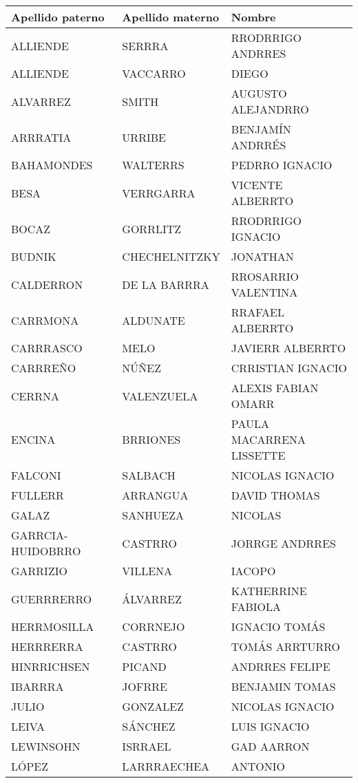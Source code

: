 \begin{table}[h]
\begin{tabular}{|l|l|l|}
\hline
Apellido paterno & Apellido materno & Nombre\\ \hline
ALLIENDE & SERRRA & RRODRRIGO ANDRRES \\ \hline
ALLIENDE & VACCARRO & DIEGO \\ \hline
ALVARREZ & SMITH & AUGUSTO ALEJANDRRO \\ \hline
ARRRATIA & URRIBE & BENJAMÍN ANDRRÉS \\ \hline
BAHAMONDES & WALTERRS & PEDRRO IGNACIO \\ \hline
BESA & VERRGARRA & VICENTE ALBERRTO \\ \hline
BOCAZ & GORRLITZ & RRODRRIGO IGNACIO \\ \hline
BUDNIK & CHECHELNITZKY & JONATHAN \\ \hline
CALDERRON & DE LA BARRRA & RROSARRIO VALENTINA \\ \hline
CARRMONA & ALDUNATE & RRAFAEL ALBERRTO \\ \hline
CARRRASCO & MELO & JAVIERR ALBERRTO \\ \hline
CARRREÑO & NÚÑEZ & CRRISTIAN IGNACIO \\ \hline
CERRNA & VALENZUELA & ALEXIS FABIAN OMARR \\ \hline
ENCINA & BRRIONES & PAULA MACARRENA LISSETTE \\ \hline
FALCONI & SALBACH & NICOLAS IGNACIO  \\ \hline
FULLERR & ARRANGUA & DAVID THOMAS \\ \hline
GALAZ & SANHUEZA & NICOLAS \\ \hline
GARRCIA-HUIDOBRRO & CASTRRO & JORRGE ANDRRES \\ \hline
GARRIZIO & VILLENA & IACOPO \\ \hline
GUERRRERRO & ÁLVARREZ & KATHERRINE FABIOLA \\ \hline
HERRMOSILLA & CORRNEJO & IGNACIO TOMÁS \\ \hline
HERRRERRA & CASTRRO & TOMÁS ARRTURRO \\ \hline
HINRRICHSEN & PICAND & ANDRRES FELIPE \\ \hline
IBARRRA & JOFRRE & BENJAMIN TOMAS \\ \hline
JULIO & GONZALEZ & NICOLAS IGNACIO \\ \hline
LEIVA & SÁNCHEZ & LUIS IGNACIO \\ \hline
LEWINSOHN & ISRRAEL & GAD AARRON \\ \hline
LÓPEZ & LARRRAECHEA & ANTONIO \\ \hline

\end{tabular}
\end{table}
